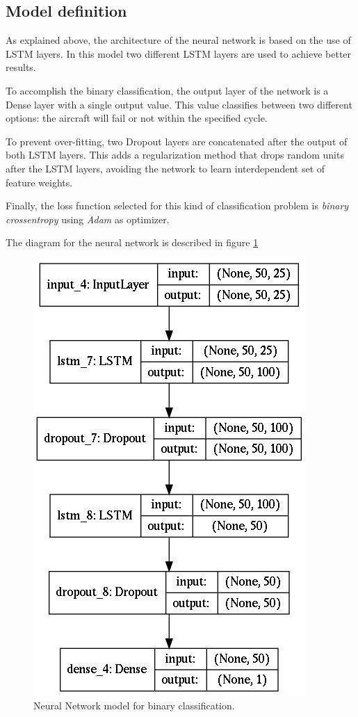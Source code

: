 
\subsection{Model definition}

As explained above, the architecture of the neural network is based on the use of LSTM layers. In this model two different LSTM layers are used to achieve better results.

To accomplish the binary classification, the output layer of the network is a Dense layer with a single output value. This value classifies between two different options: the aircraft will fail or not within the specified cycle.

To prevent over-fitting, two Dropout layers are concatenated after the output of both LSTM layers. This adds a regularization method that drops random units after the LSTM layers, avoiding the network to learn interdependent set of feature weights.

Finally, the loss function selected for this kind of classification problem is \textit{binary crossentropy} using \textit{Adam} as optimizer.

The diagram for the neural network is described in figure \ref{fig:binary-lstm-model}

\begin{figure}
\centering
\includegraphics{Figures/binary-lstm-model}
\decoRule
\caption[Neural Network model for binary classification]{Neural Network model for binary classification.}
\label{fig:binary-lstm-model}
\end{figure}

